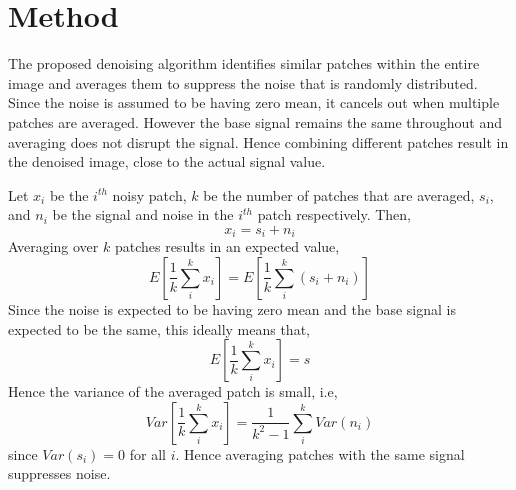 \documentclass[fleqn,10pt]{wlscirep}
\begin{document}
\section*{Method}

The proposed denoising algorithm identifies similar patches within the entire image and averages them to suppress the noise that is randomly distributed. Since the noise is assumed to be having zero mean, it cancels out when multiple patches are averaged. However the base signal remains the same throughout and averaging does not disrupt the signal. Hence combining different patches result in the denoised image, close to the actual signal value. 

Let $x_{i}$ be the $i^{th}$ noisy patch, $k$ be the number of patches that are averaged, $s_i$, and $n_i$ be the signal and noise in the $i^{th}$ patch respectively. Then,
\begin{equation}
	x_i = s_i + n_i
\end{equation}
Averaging over $k$ patches results in an expected value,
\begin{equation}
	E[\frac{1}{k}\sum_{i}^{k}x_i ] = E[\frac{1}{k}\sum_{i}^{k}(s_i + n_i) ]
\end{equation}
Since the noise is expected to be having zero mean and the base signal is expected to be the same, this ideally means that,
\begin{equation}
	E[\frac{1}{k}\sum_{i}^{k}x_i ] = s
\end{equation}
Hence the variance of the averaged patch is small, i.e,
\begin{equation}
	Var[\frac{1}{k}\sum_{i}^{k}x_i ] = \frac{1}{k^2 -1} \sum_{i}^{k}Var(n_i)
\end{equation}
since $Var(s_i) = 0$ for all $i$. Hence averaging patches with the same signal suppresses noise.


\end{document}
